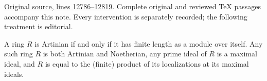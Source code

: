 \hypertarget{algebra-context-170}{}

\noindent\href{https://github.com/stacks/stacks-project/blob/a04446e57ec1fbc252a871afcec7752fb2807b14/algebra.tex\#L12786}{Original source, lines 12786--12819}. Complete original and reviewed TeX passages accompany this note. Every intervention is separately recorded; the following treatment is editorial.


\begin{lemma}
\label{editorial-source-lemma-artinian-finite-length}
A ring $R$ is Artinian if and only if it has finite length
as a module over itself. Any such ring $R$ is both Artinian and
Noetherian, any prime ideal of $R$ is a maximal ideal, and $R$ is equal
to the (finite) product of its localizations at its maximal ideals.
\end{lemma}

